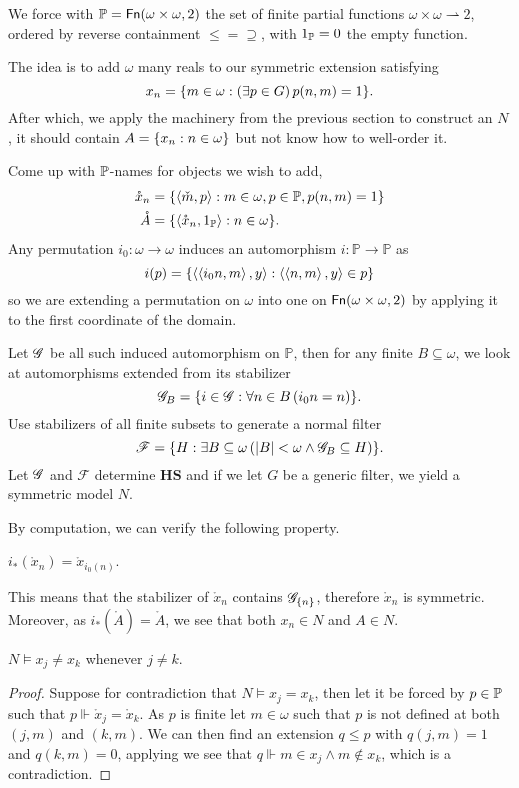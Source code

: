 We force with \(\mathbb{P} = \Fn(\omega\times\omega, 2)\)
the set of finite partial functions \(\omega\times\omega \rightharpoonup 2\),
ordered by reverse containment \(\leq = \supseteq\),
with \(1_\P = 0\) the empty function.

The idea is to add \(\omega\) many reals to our symmetric extension satisfying
\begin{equation} \label{basicCohen:property_x_n}
    x_n = \set{m\in\omega: \left(\exists p\in G\right) p(n,m) = 1}.
\end{equation}
After which, we apply the machinery from the previous section to construct an \(N\),
it should contain \( A = \set{x_n:n\in \omega } \) but not know how to well-order it.

Come up with \(\P\)-names for objects we wish to add,
\begin{align*}
    \mathring{x}_n &= \set{\Angle{\check{m},p}: m\in\omega, p\in\P,p(n,m) = 1} \\
    \mathring{A} &= \set{\Angle{\mathring{x}_n,1_\P}: n\in\omega}.
\end{align*}
Any permutation \(i_0: \omega \to \omega\) induces an automorphism \(i: \mathbb{P}\to\mathbb{P}\) as
\[ i(p) = \set{\Angle{\Angle{i_0 n, m}, y}: \Angle{\Angle{n,m},y} \in p} \]
so we are extending a permutation on \(\omega\) into one on \(\Fn(\omega\times\omega, 2)\)
by applying it to the first coordinate of the domain.

Let \(\G\) be all such induced automorphism on \(\mathbb{P}\), then for any finite \(B\subseteq \omega\),
we look at automorphisms extended from its stabilizer
\[ \G_B = \set{ i\in \G: \forall n\in B\left( i_0 n = n \right) }. \]
Use stabilizers of all finite subsets to generate a normal filter
\[ \mathscr{F} = \set{H: \exists B\subseteq \omega \left(\abs{B}<\omega \land \G_B \subseteq H\right) }. \]
Let \(\G\) and \(\mathscr{F}\) determine \(\mathbf{HS}\) and if we let \(G\) be a generic filter, we yield a symmetric model \(N\).

By computation, we can verify the following property.
\begin{proposition}
    \(i_* (\mathring{x}_n) = \mathring{x}_{i_0(n)} \).
\end{proposition}
This means that the stabilizer of \(\mathring{x}_n\) contains \(\G_\set{n}\), therefore \(\mathring{x}_n\) is symmetric.
Moreover, as \(i_*(\mathring{A}) = \mathring{A}\), we see that both \(x_n\in N\) and \(A\in N\).

\begin{lemma}
    \(N\models x_j\ne x_k\) whenever \(j\ne k\).
\end{lemma}
\begin{proof}
    Suppose for contradiction that \(N\models x_j = x_k\),
    then let it be forced by \(p\in \P\) such that \(p\Vdash \mathring{x}_j = \mathring{x}_k\).
    As \(p\) is finite let \(m\in\omega\) such that \(p\) is not defined at both \((j,m)\) and \((k,m)\).
    We can then find an extension \(q\leq p\) with \(q(j,m) = 1\) and \(q(k,m) = 0\),
    applying 
    we see that \(q\Vdash m\in x_j \land m\notin x_k\), which is a contradiction.
\end{proof}

